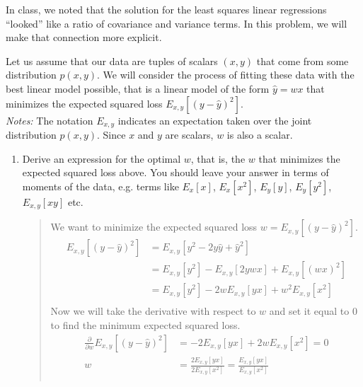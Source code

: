 \documentclass[submit]{harvardml}
\begin{document}
\begin{problem}

  In class, we noted that the solution for the least squares linear
  regressions ``looked'' like a ratio of covariance and variance
  terms.  In this problem, we will make that connection more explicit.

  Let us assume that our data are tuples of scalars $(x,y)$ that come from
  some distribution $p(x,y)$.  We will consider the process of fitting
  these data with the best linear model possible, that is a linear
  model of the form $\hat{y} = wx$ that minimizes the expected squared
  loss $E_{x,y}[ ( y - \hat{y} )^2 ]$.\\

\noindent \emph{Notes:} The notation $E_{x, y}$ indicates an
expectation taken over the joint distribution $p(x,y)$.  Since $x$ and
$y$ are scalars, $w$ is also a scalar.
  
  \begin{enumerate}

  \item Derive an expression for the optimal $w$, that is, the $w$
    that minimizes the expected squared loss above.  You should leave
    your answer in terms of moments of the data, e.g. terms like
    $E_x[x]$, $E_x[x^2]$, $E_y[y]$, $E_y[y^2]$, $E_{x,y}[xy]$ etc.
\begin{quote}
    We want to minimize the expected squared loss $w=E_{x,y}[ ( y - \hat{y} )^2 ]$.
    \begin{equation*}
        \begin{split}
            E_{x,y}[ ( y - \hat{y} )^2 ] & = E_{x,y}[ y^2 - 2y\hat{y} + \hat{y}^2 ] \\
            & = E_{x,y}[y^2]-E_{x,y}[2ywx]+E_{x,y}[(wx)^2] \\
            & = E_{x,y}[y^2]-2wE_{x,y}[yx]+w^2E_{x,y}[x^2] \\
        \end{split}
    \end{equation*}
    Now we will take the derivative with respect to $w$ and set it equal to $0$ to find the minimum expected squared loss.
    \begin{equation*}
        \begin{split}
            \frac{\partial}{\partial w}E_{x,y}[ ( y - \hat{y} )^2 ] & = -2E_{x,y}[yx]+2wE_{x,y}[x^2] = 0 \\
            w & = \frac{2E_{x,y}[yx]}{2E_{x,y}[x^2]} = \frac{E_{x,y}[yx]}{E_{x,y}[x^2]}\\
        \end{split}
    \end{equation*}
\end{quote}


\end{enumerate}
\end{problem}
\end{document}
